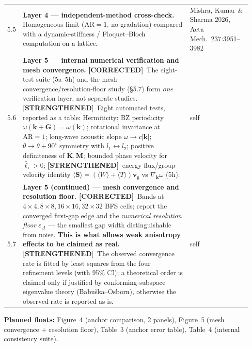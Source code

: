 \documentclass[11pt,a4paper]{article}
\newcommand{\STR}{{\color{strcol}\textbf{[STRENGTHENED]}}}
\newcommand{\COR}{{\color{corcol}\textbf{[CORRECTED]}}}
\begin{document}
\begin{xltabular}{\textwidth}{@{}L{1.5cm} Y L{3.4cm}@{}}
5.5 & \textbf{Layer 4 --- independent-method cross-check.} Homogeneous limit ($\mathrm{AR}=1$, no gradation) compared with a dynamic-stiffness / Floquet--Bloch computation on a lattice. & Mishra, Kumar \& Sharma 2026, Acta Mech.\ 237:3951--3982 \\
5.6 & \textbf{Layer 5 --- internal numerical verification and mesh convergence.} \COR\ The eight-test suite (5a--5h) and the mesh-convergence/resolution-floor study (\S5.7) form \emph{one} verification layer, not separate studies. \STR\ Eight automated tests, reported as a table: Hermiticity; BZ periodicity $\omega(\bm k+\bm G)=\omega(\bm k)$; rotational invariance at $\mathrm{AR}=1$; long-wave acoustic slope $\omega\to c|\bm k|$; $\theta\!\to\!\theta\!+\!90^\circ$ symmetry with $l_1\leftrightarrow l_2$; positive definiteness of $\bar{\bm K},\bar{\bm M}$; bounded phase velocity for $\bar\ell_{\mathrm i}>0$; \STR\ energy-flux/group-velocity identity $\langle\bm S\rangle=(\langle W\rangle+\langle T\rangle)\bm v_{\mathrm g}$ vs $\nabla_{\bm k}\omega$ (5h). & self \\
5.7 & \textbf{Layer 5 (continued) --- mesh convergence and resolution floor.} \COR\ Bands at $4{\times}4,8{\times}8,16{\times}16,32{\times}32$ BFS cells; report the converged first-gap edge and the \emph{numerical resolution floor} $\varepsilon_\Delta$ --- the smallest gap width distinguishable from noise. \textbf{This is what allows weak anisotropy effects to be claimed as real.} \STR\ The observed convergence rate is fitted by least squares from the four refinement levels (with 95\% CI); a theoretical order is claimed only if justified by conforming-subspace eigenvalue theory (Babu\v{s}ka--Osborn), otherwise the observed rate is reported as-is. & self \\
\bottomrule
\end{xltabular}

\textbf{Planned floats:} Figure~4 (anchor comparison, 2 panels), Figure~5 (mesh convergence + resolution floor), Table~3 (anchor error table), Table~4 (internal consistency suite).
\end{document}

